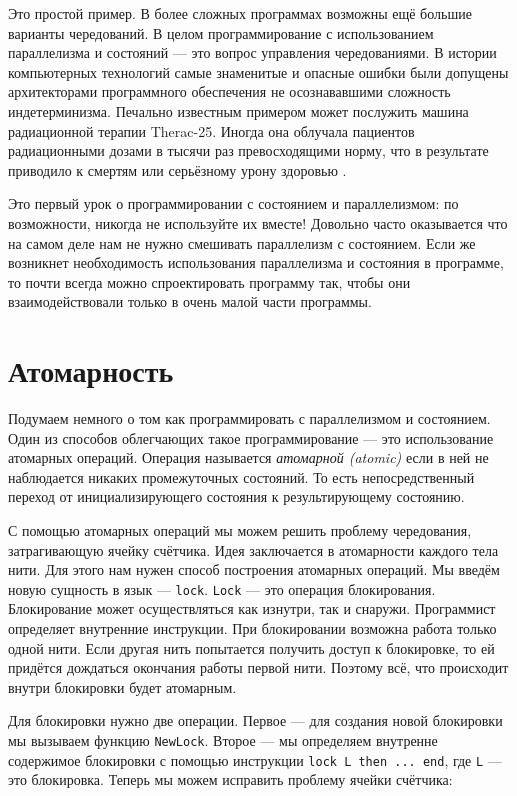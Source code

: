 Это простой пример. В более сложных программах возможны ещё большие варианты чередований. В целом программирование с использованием параллелизма и состояний --- это вопрос управления чередованиями. В истории компьютерных технологий самые знаменитые и опасные ошибки были допущены архитекторами программного обеспечения не осознававшими сложность индетерминизма. Печально известным примером может послужить машина радиационной терапии Therac-25. Иногда она облучала пациентов радиационными дозами в тысячи раз превосходящими норму, что в результате приводило к смертям или серьёзному урону здоровью \cite{112}.

Это первый урок о программировании с состоянием и параллелизмом: по возможности, никогда не используйте их вместе! Довольно часто оказывается что на самом деле нам не нужно смешивать параллелизм с состоянием. Если же возникнет необходимость использования параллелизма и состояния в программе, то почти всегда можно спроектировать программу так, чтобы они взаимодействовали только в очень малой части программы.

\section{Атомарность}\label{section:atomicity}

Подумаем немного о том как программировать с параллелизмом и состоянием. Один из способов облегчающих такое программирование --- это использование атомарных операций. Операция называется \emph{атомарной (atomic)} если в ней не наблюдается никаких промежуточных состояний. То есть непосредственный переход от инициализирующего состояния к результирующему состоянию.

С помощью атомарных операций мы можем решить проблему чередования, затрагивающую ячейку счётчика. Идея заключается в атомарности каждого тела нити. Для этого нам нужен способ построения атомарных операций. Мы введём новую сущность в язык --- \lstinline|lock|. \lstinline|Lock| --- это операция блокирования. Блокирование может осуществляться как изнутри, так и снаружи. Программист определяет внутренние инструкции. При блокировании возможна работа только одной нити. Если другая нить попытается получить доступ к блокировке, то ей придётся дождаться окончания работы первой нити. Поэтому всё, что происходит внутри блокировки будет атомарным.

Для блокировки нужно две операции. Первое --- для создания новой блокировки мы вызываем функцию \lstinline|NewLock|. Второе --- мы определяем внутренне содержимое блокировки с помощью инструкции \lstinline{lock L then ... end}, где \lstinline|L| --- это блокировка. Теперь мы можем исправить проблему ячейки счётчика:

